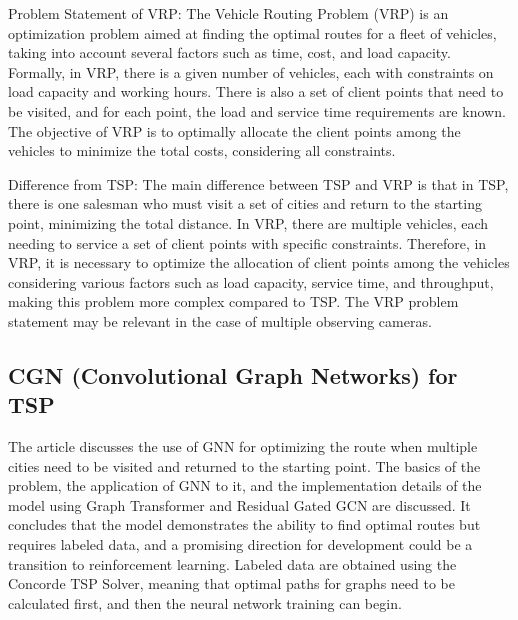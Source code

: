 Problem Statement of VRP:
The Vehicle Routing Problem (VRP) is an optimization problem aimed at finding the optimal routes for a fleet of vehicles, taking into account several factors such as time, cost, and load capacity. Formally, in VRP, there is a given number of vehicles, each with constraints on load capacity and working hours. There is also a set of client points that need to be visited, and for each point, the load and service time requirements are known. The objective of VRP is to optimally allocate the client points among the vehicles to minimize the total costs, considering all constraints.

Difference from TSP:
The main difference between TSP and VRP is that in TSP, there is one salesman who must visit a set of cities and return to the starting point, minimizing the total distance. In VRP, there are multiple vehicles, each needing to service a set of client points with specific constraints. Therefore, in VRP, it is necessary to optimize the allocation of client points among the vehicles considering various factors such as load capacity, service time, and throughput, making this problem more complex compared to TSP. The VRP problem statement may be relevant in the case of multiple observing cameras.

\subsection{CGN (Convolutional Graph Networks) for TSP}
The article \cite{gnn} discusses the use of GNN for optimizing the route when multiple cities need to be visited and returned to the starting point. The basics of the problem, the application of GNN to it, and the implementation details of the model using Graph Transformer and Residual Gated GCN are discussed. It concludes that the model demonstrates the ability to find optimal routes but requires labeled data, and a promising direction for development could be a transition to reinforcement learning. Labeled data are obtained using the Concorde TSP Solver, meaning that optimal paths for graphs need to be calculated first, and then the neural network training can begin.